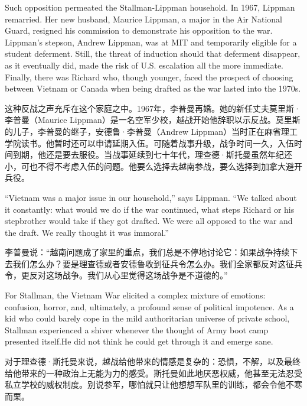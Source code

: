 \ifdefined\eng
Such opposition permeated the Stallman-Lippman household. In 1967, Lippman remarried. Her new husband, Maurice Lippman, a major in the Air National Guard, resigned his commission to demonstrate his opposition to the war. Lippman's stepson, Andrew Lippman, was at MIT and temporarily eligible for a student deferment. Still, the threat of induction should that deferment disappear, as it eventually did, made the risk of U.S. escalation all the more immediate. Finally, there was Richard who, though younger, faced the prospect of \ifdefined\vone choosing between Vietnam or Canada when \fi\ifdefined\vtwo being drafted as \fi the war lasted into the 1970s.
\fi

\ifdefined\chs
这种反战之声充斥在这个家庭之中。1967年，李普曼再婚。她的新任丈夫莫里斯·李普曼（Maurice Lippman）是一名空军少校，越战开始他辞职以示反战。莫里斯的儿子，李普曼的继子，安德鲁·李普曼（Andrew Lippman）当时正在麻省理工学院读书。他暂时还可以申请延期入伍。可随着战事升级，战争时间一久，入伍时间到期，他还是要去服役。当战事延续到七十年代，理查德·斯托曼虽然年纪还小，可也不得不考虑入伍的问题。他要么选择去越南参战，要么选择到加拿大避开兵役。
\fi

\ifdefined\eng
``Vietnam was a major issue in our household,'' says Lippman. ``We talked about it constantly: what would we do if the war continued, what steps Richard or his stepbrother would take if they got drafted. We were all opposed to the war and the draft. We really thought it was immoral.''
\fi

\ifdefined\chs
李普曼说：``越南问题成了家里的重点，我们总是不停地讨论它：如果战争持续下去我们怎么办？要是理查德或者安德鲁收到征兵令怎么办。我们全家都反对这征兵令，更反对这场战争。我们从心里觉得这场战争是不道德的。''
\fi

\ifdefined\eng
For Stallman, the Vietnam War elicited a complex mixture of emotions: confusion, horror, and, ultimately, a profound sense of political impotence. As a kid who could barely cope in the mild authoritarian universe of private school, Stallman experienced a shiver whenever the thought of Army boot camp presented itself.\ifdefined\vtwo He did not think he could get through it and emerge sane.\fi
\fi

\ifdefined\chs
对于理查德·斯托曼来说，越战给他带来的情感是复杂的：恐惧，不解，以及最终给他带来的一种政治上无能为力的感受。斯托曼如此地厌恶权威，他甚至无法忍受私立学校的威权制度。别说参军，哪怕就只让他想想军队里的训练，都会令他不寒而栗。
\fi

